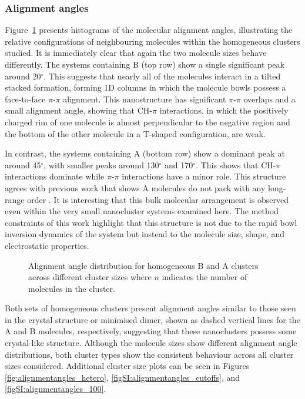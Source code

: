 \subsubsection{Alignment angles}
Figure~\ref{fig:alignmentangles_homo} presents histograms of the molecular alignment angles, illustrating the relative configurations of neighbouring molecules within the homogeneous clusters studied. It is immediately clear that again the two molecule sizes behave differently. The systems containing B (top row) show a single significant peak around 20$^{\circ}$.  This suggests that nearly all of the molecules interact in a tilted stacked formation, forming 1D columns in which the molecule bowls possess a face-to-face $\pi$-$\pi$ alignment. This nanostructure has significant $\pi$-$\pi$ overlaps and a small alignment angle, showing that CH-$\pi$ interactions, in which the positively charged rim of one molecule is almost perpendicular to the negative region and the bottom of the other molecule in a T-shaped configuration, are weak.  

In contrast, the systems containing A (bottom row) show a dominant peak at around 45$^{\circ}$, with smaller peaks around 130$^{\circ}$ and 170$^{\circ}$. This shows that CH-$\pi$ interactions dominate while $\pi$-$\pi$ interactions have a minor role. This structure agrees with previous work that shows A molecules do not pack with any long-range order \cite{hanson1976crystal,Petrukhina2005,kanao2018differentiating,wang2015electronic,scott1999geodesic}. It is interesting that this bulk molecular arrangement is observed even within the very small nanocluster systems examined here. The method constraints of this work highlight that this structure is not due to the rapid bowl inversion dynamics of the system but instead to the molecule size, shape, and electrostatic properties.
%
\begin{figure}[!tbh]
\centering
\caption{Alignment angle distribution for homogeneous B and A clusters across different cluster sizes where $n$ indicates the number of molecules in the cluster.}
\label{fig:alignmentangles_homo}
\end{figure}
%
Both sets of homogeneous clusters present alignment angles similar to those seen in the crystal structure or minimised dimer, shown as dashed vertical lines for the A and B molecules, respectively, suggesting that these nanoclusters possess some crystal-like structure.  Although the molecule sizes show different alignment angle distributions, both cluster types show the consistent behaviour across all cluster sizes considered. Additional cluster size plots can be seen in Figures \ref{fig:alignmentangles_hetero}, \ref{figSI:alignmentangles_cutoffs}, and \ref{figSI:alignmentangles_100}.

